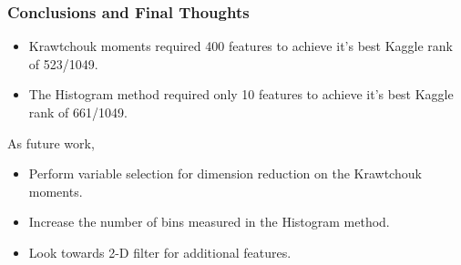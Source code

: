 \documentclass{beamer}
\begin{document}

\begin{frame}
	\frametitle{Conclusions and Final Thoughts}
	\begin{itemize}
		\item Krawtchouk moments required 400 features to achieve it's best Kaggle rank of 523/1049.
		\item The Histogram method required only 10 features to achieve it's best Kaggle rank of 661/1049.
	\end{itemize}
As future work, 
	\begin{itemize}
		\item Perform variable selection for dimension reduction on the Krawtchouk moments.
		\item Increase the number of bins measured in the Histogram method.
		\item Look towards 2-D filter for additional features.
	\end{itemize}
\end{frame}
\end{document}

